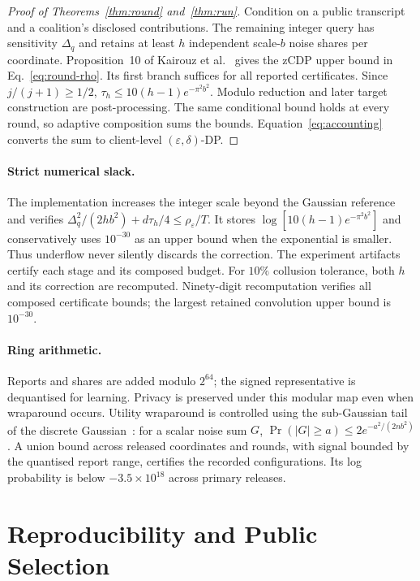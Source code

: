 \begin{proof}[Proof of Theorems~\ref{thm:round} and~\ref{thm:run}]
Condition on a public transcript and a coalition's disclosed contributions.
The remaining integer query has sensitivity $\Delta_q$ and retains at least
$h$ independent scale-$b$ noise shares per coordinate.
Proposition~10 of Kairouz et al.~\cite{kairouz2021distributed} gives the
zCDP upper bound in Eq.~\eqref{eq:round-rho}. Its first branch suffices for
all reported certificates. Since $j/(j+1)\ge1/2$,
$\tau_h\le10(h-1)e^{-\pi^2b^2}$.
Modulo reduction and later target construction are post-processing.
The same conditional bound holds at every round, so adaptive composition
sums the bounds. Equation~\eqref{eq:accounting} converts the sum to
client-level $(\varepsilon,\delta)$-DP.
\end{proof}

\paragraph{Strict numerical slack.}
The implementation increases the integer scale beyond the Gaussian reference
and verifies $\Delta_q^2/(2hb^2)+d\tau_h/4\le\rho_\varepsilon/T$.
It stores $\log[10(h-1)e^{-\pi^2b^2}]$ and conservatively uses
$10^{-30}$ as an upper bound when the exponential is smaller.
Thus underflow never silently discards the correction.
The experiment artifacts certify each stage and its composed budget.
For $10\%$ collusion tolerance, both $h$ and its correction are recomputed.
Ninety-digit recomputation verifies all composed certificate bounds; the
largest retained convolution upper bound is $10^{-30}$.

\paragraph{Ring arithmetic.}
Reports and shares are added modulo $2^{64}$; the signed representative is
dequantised for learning. Privacy is preserved under this modular map even
when wraparound occurs. Utility wraparound is controlled using the
sub-Gaussian tail of the discrete Gaussian~\cite{kairouz2021distributed}:
for a scalar noise sum $G$, $\Pr(|G|\ge a)\le2e^{-a^2/(2nb^2)}$.
A union bound across released coordinates and rounds, with signal bounded by
the quantised report range, certifies the recorded configurations.
Its log probability is below $-3.5\times10^{18}$ across primary releases.

\section{Reproducibility and Public Selection}
\label{app:repro}

